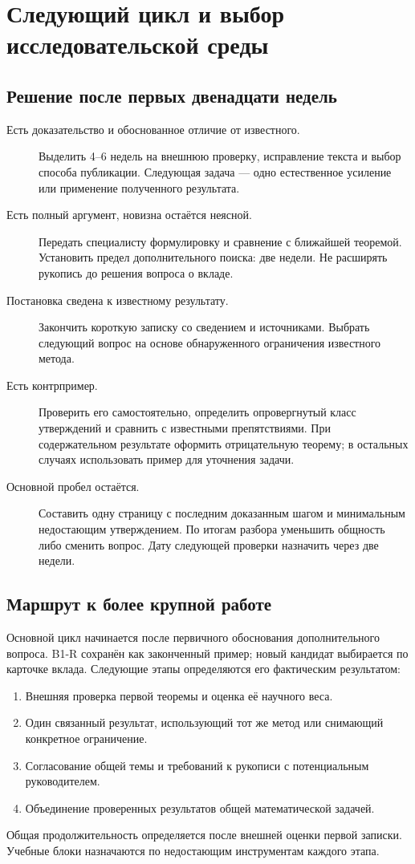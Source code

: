 \chapter{Следующий цикл и выбор исследовательской среды}

\section{Решение после первых двенадцати недель}
\begin{description}
\item[Есть доказательство и обоснованное отличие от известного.]
Выделить 4--6 недель на внешнюю проверку, исправление текста и выбор
способа публикации. Следующая задача --- одно естественное усиление
или применение полученного результата.
\item[Есть полный аргумент, новизна остаётся неясной.]
Передать специалисту формулировку и сравнение с ближайшей теоремой.
Установить предел дополнительного поиска: две недели.
Не расширять рукопись до решения вопроса о вкладе.
\item[Постановка сведена к известному результату.]
Закончить короткую записку со сведением и источниками. Выбрать следующий
вопрос на основе обнаруженного ограничения известного метода.
\item[Есть контрпример.]
Проверить его самостоятельно, определить опровергнутый класс утверждений
и сравнить с известными препятствиями. При содержательном результате
оформить отрицательную теорему; в остальных случаях использовать пример
для уточнения задачи.
\item[Основной пробел остаётся.]
Составить одну страницу с последним доказанным шагом и минимальным
недостающим утверждением. По итогам разбора уменьшить общность либо
сменить вопрос. Дату следующей проверки назначить через две недели.
\end{description}

\section{Маршрут к более крупной работе}
Основной цикл начинается после первичного обоснования дополнительного
вопроса. B1-R сохранён как законченный пример; новый кандидат выбирается
по карточке вклада. Следующие этапы определяются его фактическим результатом:
\begin{enumerate}
\item Внешняя проверка первой теоремы и оценка её научного веса.
\item Один связанный результат, использующий тот же метод или снимающий
      конкретное ограничение.
\item Согласование общей темы и требований к рукописи с потенциальным
      руководителем.
\item Объединение проверенных результатов общей математической задачей.
\end{enumerate}
Общая продолжительность определяется после внешней оценки первой записки.
Учебные блоки назначаются по недостающим инструментам каждого этапа.

